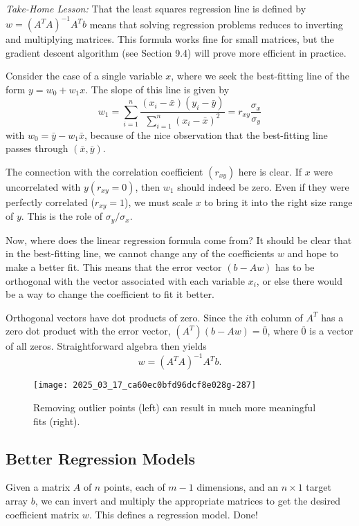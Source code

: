 \documentclass[10pt]{article}
\begin{document}
\textit{Take-Home Lesson:} That the least squares regression line is defined by $w=\left(A^{T} A\right)^{-1} A^{T} b$ means that solving regression problems reduces to inverting and multiplying matrices. This formula works fine for small matrices, but the gradient descent algorithm (see Section 9.4) will prove more efficient in practice.

Consider the case of a single variable $x$, where we seek the best-fitting line of the form $y=w_{0}+w_{1} x$. The slope of this line is given by
\[
w_{1}=\sum_{i=1}^{n} \frac{\left(x_{i}-\bar{x}\right)\left(y_{i}-\bar{y}\right)}{\sum_{i=1}^{n}\left(x_{i}-\bar{x}\right)^{2}}=r_{x y} \frac{\sigma_{x}}{\sigma_{y}}
\]
with $w_{0}=\bar{y}-w_{1} \bar{x}$, because of the nice observation that the best-fitting line passes through $(\bar{x}, \bar{y})$.

The connection with the correlation coefficient $\left(r_{x y}\right)$ here is clear. If $x$ were uncorrelated with $y\left(r_{x y}=0\right)$, then $w_{1}$ should indeed be zero. Even if they were perfectly correlated ($r_{x y}=1$), we must scale $x$ to bring it into the right size range of $y$. This is the role of $\sigma_{y} / \sigma_{x}$.

Now, where does the linear regression formula come from? It should be clear that in the best-fitting line, we cannot change any of the coefficients $w$ and hope to make a better fit. This means that the error vector $(b-A w)$ has to be orthogonal with the vector associated with each variable $x_{i}$, or else there would be a way to change the coefficient to fit it better.

Orthogonal vectors have dot products of zero. Since the $i$th column of $A^{T}$ has a zero dot product with the error vector, $\left(A^{T}\right)(b-A w)=\overline{0}$, where $\overline{0}$ is a vector of all zeros. Straightforward algebra then yields
\[
w=\left(A^{T} A\right)^{-1} A^{T} b.
\]

\begin{figure}[H]
\centering
\texttt{[image: 2025\_03\_17\_ca60ec0bfd96dcf8e028g-287]}
\caption{Removing outlier points (left) can result in much more meaningful fits (right).}
\end{figure}

\subsection{Better Regression Models}
Given a matrix $A$ of $n$ points, each of $m-1$ dimensions, and an $n \times 1$ target array $b$, we can invert and multiply the appropriate matrices to get the desired coefficient matrix $w$. This defines a regression model. Done!
\end{document}
